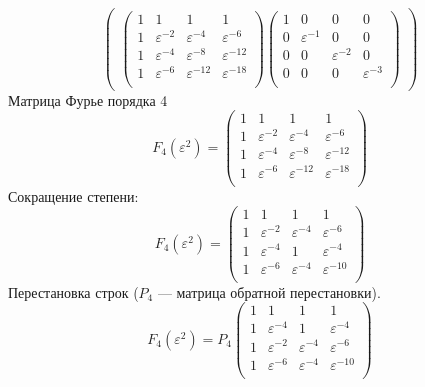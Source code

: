 \[\begin{pmatrix}
\begin{pmatrix}
            1 & 1                & 1                 & 1                 \\
            1 & \varepsilon^{-2} & \varepsilon^{-4}  & \varepsilon^{-6}  \\
            1 & \varepsilon^{-4} & \varepsilon^{-8}  & \varepsilon^{-12} \\
            1 & \varepsilon^{-6} & \varepsilon^{-12} & \varepsilon^{-18} \\
        \end{pmatrix}
        \begin{pmatrix}
            1 & 0                & 0                & 0                \\
            0 & \varepsilon^{-1} & 0                & 0                \\
            0 & 0                & \varepsilon^{-2} & 0                \\
            0 & 0                & 0                & \varepsilon^{-3} \\
        \end{pmatrix}
    \end{pmatrix}
\]
Матрица Фурье порядка 4
\[
    F_4(\varepsilon^2)
    = \begin{pmatrix}
        1 & 1                & 1                 & 1                 \\
        1 & \varepsilon^{-2} & \varepsilon^{-4}  & \varepsilon^{-6}  \\
        1 & \varepsilon^{-4} & \varepsilon^{-8}  & \varepsilon^{-12} \\
        1 & \varepsilon^{-6} & \varepsilon^{-12} & \varepsilon^{-18} \\
    \end{pmatrix}
\]
Сокращение степени:
\[
    F_4(\varepsilon^2)
    = \begin{pmatrix}
        1 & 1                & 1                & 1                 \\
        1 & \varepsilon^{-2} & \varepsilon^{-4} & \varepsilon^{-6}  \\
        1 & \varepsilon^{-4} & 1                & \varepsilon^{-4}  \\
        1 & \varepsilon^{-6} & \varepsilon^{-4} & \varepsilon^{-10} \\
    \end{pmatrix}
\]
Перестановка строк ($P_4$ --- матрица обратной перестановки).
\[
    F_4(\varepsilon^2)
    =
    P_4
    \begin{pmatrix}
        1 & 1                & 1                & 1                 \\
        1 & \varepsilon^{-4} & 1                & \varepsilon^{-4}  \\
        1 & \varepsilon^{-2} & \varepsilon^{-4} & \varepsilon^{-6}  \\
        1 & \varepsilon^{-6} & \varepsilon^{-4} & \varepsilon^{-10} \\
    \end{pmatrix}
\]
